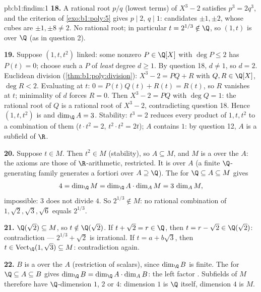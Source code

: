 \begin{solution}{pb:b1:findim:1}
\textbf{18.} A rational root $p/q$ (lowest terms) of $X^3 - 2$
satisfies $p^3 = 2q^3$, and the criterion of
\cref{exo:b1:poly:5} gives $p \mid 2$, $q \mid 1$: candidates
$\pm1, \pm2$, whose cubes are $\pm1, \pm8 \neq 2$. No rational
root; in particular $t = 2^{1/3} \notin \Q$, so $(1, t)$ is 
over $\Q$ (as in question 2).

\textbf{19.} Suppose $(1, t, t^2)$ linked: some nonzero $P \in
\Q[X]$ with $\deg P \leq 2$ has $P(t) = 0$; choose such a $P$ of
\emph{least} degree $d \geq 1$. By question 18, $d \neq 1$, so $d
= 2$. Euclidean division (\cref{thm:b1:poly:division}): $X^3 - 2
= PQ + R$ with $Q, R \in \Q[X]$, $\deg R < 2$. Evaluating at $t$:
$0 = P(t)Q(t) + R(t) = R(t)$, so $R$ vanishes at $t$; minimality
of $d$ forces $R = 0$. Then $X^3 - 2 = PQ$ with $\deg Q = 1$: the
rational root of $Q$ is a rational root of $X^3 - 2$,
contradicting question 18. Hence $(1, t, t^2)$ is  and
$\dim_\Q A = 3$. Stability: $t^3 = 2$ reduces every product of
$1, t, t^2$ to a combination of them ($t\cdot t^2 = 2$, $t^2\cdot
t^2 = 2t$); $A$ contains $1$: by question 12, $A$ is a subfield
of $\R$.

\textbf{20.} Suppose $t \in M$. Then $t^2 \in M$ (stability), so
$A \subseteq M$, and $M$ is a  over the  $A$:
the axioms are those of $\R$-arithmetic, restricted. It is
 over $A$ (a finite $\Q$-generating family
generates a fortiori over $A \supseteq \Q$). The  for
$\Q \subseteq A \subseteq M$ gives
\[
4 = \dim_\Q M = \dim_\Q A \cdot \dim_A M = 3\,\dim_A M ,
\]
impossible: $3$ does not divide $4$. So $2^{1/3} \notin M$: no
rational combination of $1, \sqrt2, \sqrt3, \sqrt6$ equals
$2^{1/3}$.

\textbf{21.} $\Q(\sqrt2) \subseteq M$, so $t \notin \Q(\sqrt2)$.
If $t + \sqrt2 = r \in \Q$, then $t = r - \sqrt2 \in \Q(\sqrt2)$:
contradiction --- $2^{1/3} + \sqrt2$ is irrational. If $t = a +
b\sqrt3$, then $t \in \operatorname{Vect}_\Q(1, \sqrt3) \subseteq
M$: contradiction again.

\textbf{22.} $B$ is a  over the  $A$
(restriction of scalars),  since $\dim_\Q B$ is
finite. The  for $\Q \subseteq A \subseteq B$ gives
$\dim_\Q B = \dim_\Q A \cdot \dim_A B$: the left factor .
Subfields of $M$ therefore have $\Q$-dimension $1$, $2$ or $4$:
dimension $1$ is $\Q$ itself, dimension $4$ is $M$.


\end{solution}
